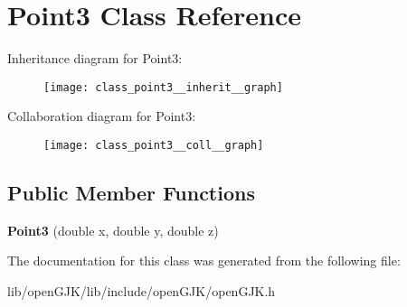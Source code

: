 \hypertarget{class_point3}{}\section{Point3 Class Reference}
\label{class_point3}


Inheritance diagram for Point3\+:
\nopagebreak
\begin{figure}[H]
\begin{center}
\leavevmode
\texttt{[image: class\_point3\_\_inherit\_\_graph]}
\end{center}
\end{figure}


Collaboration diagram for Point3\+:
\nopagebreak
\begin{figure}[H]
\begin{center}
\leavevmode
\texttt{[image: class\_point3\_\_coll\_\_graph]}
\end{center}
\end{figure}
\subsection*{Public Member Functions}
\begin{DoxyCompactItemize}
\item 
\mbox{\label{class_point3_a2d456f96475506f6eb9053d5c2b1a910}} 
{\bfseries Point3} (double x, double y, double z)
\end{DoxyCompactItemize}


The documentation for this class was generated from the following file\+:\begin{DoxyCompactItemize}
\item 
lib/open\+G\+J\+K/lib/include/open\+G\+J\+K/open\+G\+J\+K.\+h\end{DoxyCompactItemize}
